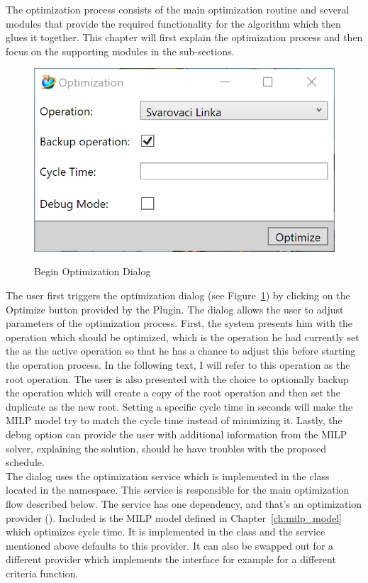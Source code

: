 The optimization process consists of the main optimization routine and several modules that provide the required functionality for the algorithm which then glues it together. This chapter will first explain the optimization process and then focus on the supporting modules in the sub-sections. \\

\begin{figure}[H]
	\caption{Begin Optimization Dialog}
	\centering
	\includegraphics{dialog_beginoptimization}
	\label{fig:DialogBeginOptimization}
\end{figure}

The user first triggers the optimization dialog (see Figure~\ref{fig:DialogBeginOptimization}) by clicking on the Optimize button provided by the Plugin. 
The dialog allows the user to adjust parameters of the optimization process. 
First, the system presents him with the operation which should be optimized, which is the operation he had currently set the as the active operation so that he has a chance to adjust this before starting the operation process. In the following text, I will refer to this operation as the root operation.
The user is also presented with the choice to optionally backup the operation which will create a copy of the root operation and then set the duplicate as the new root.
Setting a specific cycle time in seconds will make the MILP model try to match the cycle time instead of minimizing it.
Lastly, the debug option can provide the user with additional information from the MILP solver, explaining the solution, should he have troubles with the proposed schedule. \\

The dialog uses the optimization service which is implemented in the  class located in the  namespace. This service is responsible for the main optimization flow described below. The service has one dependency, and that's an optimization provider (). Included is the MILP model defined in Chapter~\ref{ch:milp_model} which optimizes cycle time. It is implemented in the  class and the service mentioned above defaults to this provider. It can also be swapped out for a different provider which implements the  interface for example for a different criteria function. \\


